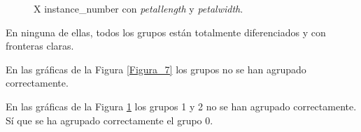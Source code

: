 \documentclass[a4paper, 11pt]{exam}
\begin{document}
\begin{questions}
\begin{itemize}
\begin{figure}[h]
		\caption{X instance\_number con \textit{petallength} y \textit{petalwidth}.}
		\label{Figura_8}
	\end{figure}
\end{itemize}

En ninguna de ellas, todos los grupos están totalmente diferenciados y con fronteras claras. 

En las gráficas de la Figura \ref{Figura_7} los grupos no se han agrupado correctamente.

En las gráficas de la Figura \ref{Figura_8} los grupos 1 y 2 no se han agrupado correctamente. Sí que se ha agrupado correctamente el grupo 0.

\end{questions}
\end{document}
